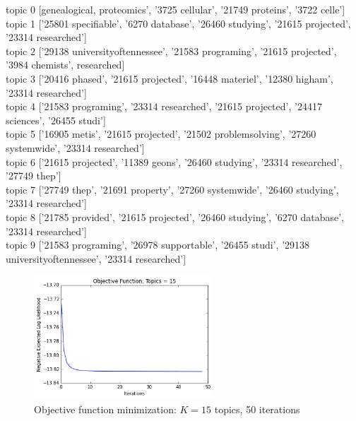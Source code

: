 \documentclass[submit]{harvardml}
\begin{document}
\noindent
topic 0 [genealogical, proteomics', '3725 cellular', '21749 proteins', '3722 celle'] \\
topic 1 ['25801 specifiable', '6270 database', '26460 studying', '21615 projected', '23314 researched'] \\
topic 2 ['29138 universityoftennessee', '21583 programing', '21615 projected', '3984 chemists', researched] \\
topic 3 ['20416 phased', '21615 projected', '16448 materiel', '12380 higham', '23314 researched'] \\
topic 4 ['21583 programing', '23314 researched', '21615 projected', '24417 sciences', '26455 studi'] \\
topic 5 ['16905 metis', '21615 projected', '21502 problemsolving', '27260 systemwide', '23314 researched'] \\
topic 6 ['21615 projected', '11389 geons', '26460 studying', '23314 researched', '27749 thep'] \\
topic 7 ['27749 thep', '21691 property', '27260 systemwide', '26460 studying', '23314 researched'] \\
topic 8 ['21785 provided', '21615 projected', '26460 studying', '6270 database', '23314 researched'] \\
topic 9 ['21583 programing', '26978 supportable', '26455 studi', '29138 universityoftennessee', '23314 researched'] \\

\newpage

\begin{figure}
	\centering
	\includegraphics[width=0.6\textwidth]{output_7_2.png}
	\caption{Objective function minimization: $K = 15$ topics, 50 iterations}
\end{figure}
\end{document}
